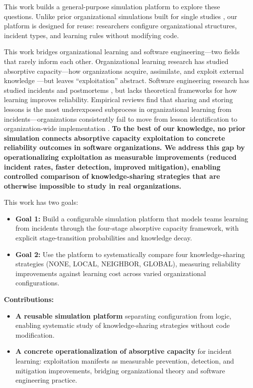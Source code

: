 \documentclass[conference,10pt]{IEEEtran}
\begin{document}
This work builds a general-purpose simulation platform to explore these questions. Unlike prior organizational simulations built for single studies \cite{harrison2007}, our platform is designed for reuse: researchers configure organizational structures, incident types, and learning rules without modifying code.

This work bridges organizational learning and software engineering---two fields that rarely inform each other. Organizational learning research has studied absorptive capacity---how organizations acquire, assimilate, and exploit external knowledge \cite{cohen1990, zahra2002}---but leaves ``exploitation'' abstract. Software engineering research has studied incidents and postmortems \cite{lunney2016, dogga2023}, but lacks theoretical frameworks for how learning improves reliability. Empirical reviews find that sharing and storing lessons is the most underexposed subprocess in organizational learning from incidents---organizations consistently fail to move from lesson identification to organization-wide implementation \cite{drupsteen2014}. \textbf{To the best of our knowledge, no prior simulation connects absorptive capacity exploitation to concrete reliability outcomes in software organizations. We address this gap by operationalizing exploitation as measurable improvements (reduced incident rates, faster detection, improved mitigation), enabling controlled comparison of knowledge-sharing strategies that are otherwise impossible to study in real organizations.}

This work has two goals:
\begin{itemize}
    \item \textbf{Goal 1:} Build a configurable simulation platform that models teams learning from incidents through the four-stage absorptive capacity framework, with explicit stage-transition probabilities and knowledge decay.
    \item \textbf{Goal 2:} Use the platform to systematically compare four knowledge-sharing strategies (NONE, LOCAL, NEIGHBOR, GLOBAL), measuring reliability improvements against learning cost across varied organizational configurations.
\end{itemize}

\textbf{Contributions:}
\begin{itemize}
    \item \textbf{A reusable simulation platform} separating configuration from logic, enabling systematic study of knowledge-sharing strategies without code modification.
    \item \textbf{A concrete operationalization of absorptive capacity} for incident learning: exploitation manifests as measurable prevention, detection, and mitigation improvements, bridging organizational theory and software engineering practice.
\end{itemize}
\end{document}
